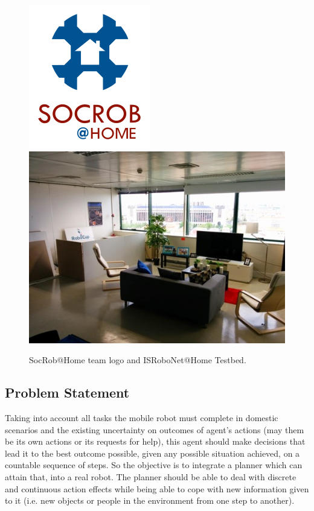 \begin{figure}[H]
    \centering
        \includegraphics[scale=0.5]{images/socrob_home_logo}
        \includegraphics[scale=0.8]{images/testbed}
        \caption{SocRob@Home team logo and ISRoboNet@Home Testbed.}
        \label{fig:socrobhome}
\end{figure}

\subsection{Problem Statement}

Taking into account all tasks the mobile robot must complete in domestic
scenarios and the existing uncertainty on outcomes of agent's actions (may them 
be its own actions or its requests for help), this
agent should make decisions that lead it to the best outcome possible, given
any possible situation achieved, on a countable sequence of steps. So the 
objective is to integrate a planner which can attain that, into a real robot.
The planner should be able to deal with discrete and continuous action effects 
while being able to cope with new information given to it (i.e. new objects or people
in the environment from one step to another).

